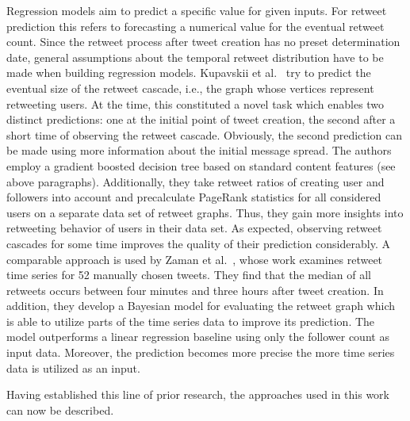 Regression models aim to predict a specific value for given inputs.
For retweet prediction this refers to forecasting a numerical value for the
eventual retweet count.
Since the retweet process after tweet creation has no preset determination date, general assumptions
about the temporal retweet distribution have to be made when building
regression models.
Kupavskii et al.~\cite{Kupavskii2012} try to predict the eventual size of the
retweet cascade, i.e., the graph whose vertices represent retweeting users.
At the time, this constituted a novel task which enables two distinct predictions:
one at the initial point of tweet creation, the second after a short
time of observing the retweet cascade.
Obviously, the second prediction can be made using more information about the
initial message spread.
The authors employ a gradient boosted decision tree based on standard content
features (see above paragraphs).
Additionally, they take retweet ratios of creating user and followers into
account and precalculate PageRank statistics for all considered users on a
separate data set of retweet graphs.
Thus, they gain more insights into retweeting behavior of users in their data
set.
As expected, observing retweet cascades for some time improves the quality
of their prediction considerably.
A comparable approach is used by Zaman et al.~\cite{Zaman2014}, whose work
examines retweet time series for 52 manually chosen tweets.
They find that the median of all retweets occurs between four minutes and three
hours after tweet creation.
In addition, they develop a Bayesian model for evaluating the retweet graph
which is able to utilize parts of the time series data to improve its
prediction.
The model outperforms a linear regression baseline using only
the follower count as input data.
Moreover, the prediction becomes more precise the more time series data is utilized
as an input.

Having established this line of prior research, the approaches used in this
work can now be described.
